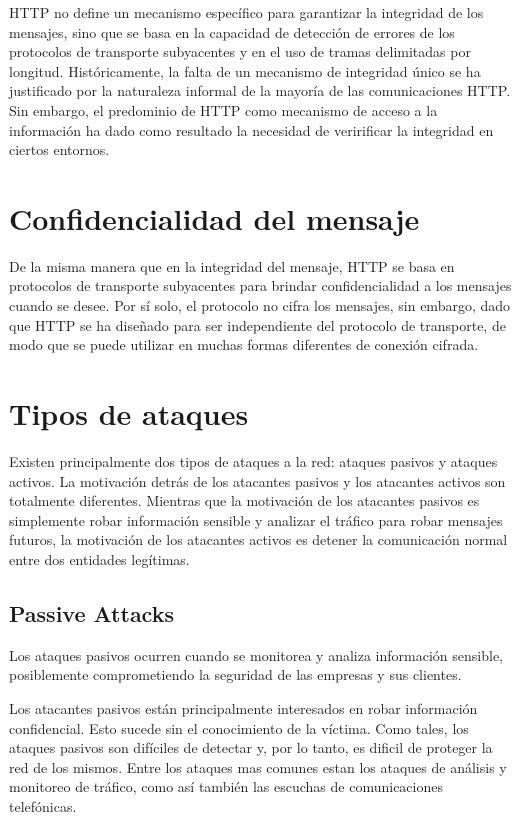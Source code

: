 HTTP no define un mecanismo específico para garantizar la integridad de los 
mensajes, sino que se basa en la capacidad de detección de errores de los 
protocolos de transporte subyacentes y en el uso de tramas delimitadas por 
longitud. Históricamente, la falta de un mecanismo de integridad único se 
ha justificado por la naturaleza informal de la mayoría de las comunicaciones 
HTTP. Sin embargo, el predominio de HTTP como mecanismo de acceso a la 
información ha dado como resultado la necesidad de veririficar la integridad
en ciertos entornos.

\section{Confidencialidad del mensaje}

De la misma manera que en la integridad del mensaje, HTTP se basa en 
protocolos de transporte subyacentes para brindar confidencialidad a los 
mensajes cuando se desee. Por sí solo, el protocolo no cifra los mensajes, 
sin embargo, dado que HTTP se ha diseñado para ser independiente del protocolo de 
transporte, de modo que se puede utilizar en muchas formas diferentes de 
conexión cifrada.


\section{Tipos de ataques}
Existen principalmente dos tipos de ataques a la red: ataques pasivos y 
ataques activos. La motivación detrás de los atacantes pasivos y los atacantes 
activos son totalmente diferentes. Mientras que la motivación de los atacantes 
pasivos es simplemente robar información sensible y analizar el tráfico para 
robar mensajes futuros, la motivación de los atacantes activos es detener la 
comunicación normal entre dos entidades legítimas.

\subsection{Passive Attacks}
Los ataques pasivos ocurren cuando se monitorea y analiza 
información sensible, posiblemente comprometiendo la seguridad de las 
empresas y sus clientes. 

Los atacantes pasivos están principalmente interesados en robar información 
confidencial. Esto sucede sin el conocimiento de la víctima. Como tales, 
los ataques pasivos son difíciles de detectar y, por lo tanto, es dificil de
proteger la red de los mismos. Entre los ataques mas comunes estan los 
ataques de análisis y monitoreo de tráfico, como así también las 
escuchas de comunicaciones telefónicas.

